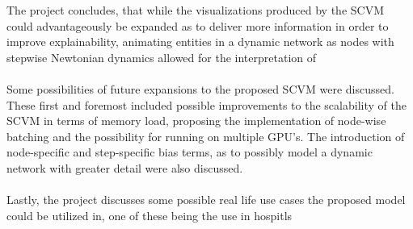 The project concludes, that while the visualizations produced by the SCVM could advantageously be expanded as to deliver more information in order to improve explainability, animating entities in a dynamic network as nodes with stepwise Newtonian dynamics allowed for the interpretation of 
\\\\
Some possibilities of future expansions to the proposed SCVM were discussed.
These first and foremost included possible improvements to the scalability of the SCVM in terms of memory load, proposing the implementation of node-wise batching and the possibility for running on multiple GPU's.
The introduction of node-specific and step-specific bias terms, as to possibly model a dynamic network with greater detail were also discussed.
\\\\
Lastly, the project discusses some possible real life use cases the proposed model could be utilized in, one of these being the use in hospitls 

